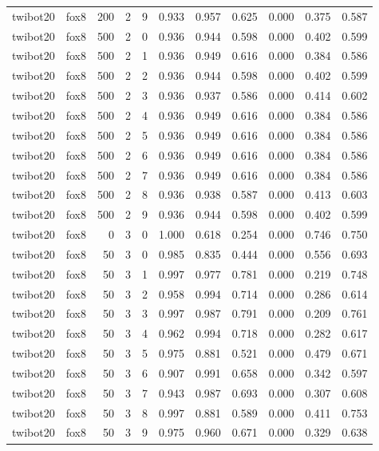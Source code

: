 \begin{tabular}{llrrrrrrrrr}
twibot20 & fox8 & 200 & 2 & 9 & 0.933 & 0.957 & 0.625 & 0.000 & 0.375 & 0.587 \\
twibot20 & fox8 & 500 & 2 & 0 & 0.936 & 0.944 & 0.598 & 0.000 & 0.402 & 0.599 \\
twibot20 & fox8 & 500 & 2 & 1 & 0.936 & 0.949 & 0.616 & 0.000 & 0.384 & 0.586 \\
twibot20 & fox8 & 500 & 2 & 2 & 0.936 & 0.944 & 0.598 & 0.000 & 0.402 & 0.599 \\
twibot20 & fox8 & 500 & 2 & 3 & 0.936 & 0.937 & 0.586 & 0.000 & 0.414 & 0.602 \\
twibot20 & fox8 & 500 & 2 & 4 & 0.936 & 0.949 & 0.616 & 0.000 & 0.384 & 0.586 \\
twibot20 & fox8 & 500 & 2 & 5 & 0.936 & 0.949 & 0.616 & 0.000 & 0.384 & 0.586 \\
twibot20 & fox8 & 500 & 2 & 6 & 0.936 & 0.949 & 0.616 & 0.000 & 0.384 & 0.586 \\
twibot20 & fox8 & 500 & 2 & 7 & 0.936 & 0.949 & 0.616 & 0.000 & 0.384 & 0.586 \\
twibot20 & fox8 & 500 & 2 & 8 & 0.936 & 0.938 & 0.587 & 0.000 & 0.413 & 0.603 \\
twibot20 & fox8 & 500 & 2 & 9 & 0.936 & 0.944 & 0.598 & 0.000 & 0.402 & 0.599 \\
twibot20 & fox8 & 0 & 3 & 0 & 1.000 & 0.618 & 0.254 & 0.000 & 0.746 & 0.750 \\
twibot20 & fox8 & 50 & 3 & 0 & 0.985 & 0.835 & 0.444 & 0.000 & 0.556 & 0.693 \\
twibot20 & fox8 & 50 & 3 & 1 & 0.997 & 0.977 & 0.781 & 0.000 & 0.219 & 0.748 \\
twibot20 & fox8 & 50 & 3 & 2 & 0.958 & 0.994 & 0.714 & 0.000 & 0.286 & 0.614 \\
twibot20 & fox8 & 50 & 3 & 3 & 0.997 & 0.987 & 0.791 & 0.000 & 0.209 & 0.761 \\
twibot20 & fox8 & 50 & 3 & 4 & 0.962 & 0.994 & 0.718 & 0.000 & 0.282 & 0.617 \\
twibot20 & fox8 & 50 & 3 & 5 & 0.975 & 0.881 & 0.521 & 0.000 & 0.479 & 0.671 \\
twibot20 & fox8 & 50 & 3 & 6 & 0.907 & 0.991 & 0.658 & 0.000 & 0.342 & 0.597 \\
twibot20 & fox8 & 50 & 3 & 7 & 0.943 & 0.987 & 0.693 & 0.000 & 0.307 & 0.608 \\
twibot20 & fox8 & 50 & 3 & 8 & 0.997 & 0.881 & 0.589 & 0.000 & 0.411 & 0.753 \\
twibot20 & fox8 & 50 & 3 & 9 & 0.975 & 0.960 & 0.671 & 0.000 & 0.329 & 0.638 \\

\end{tabular}
